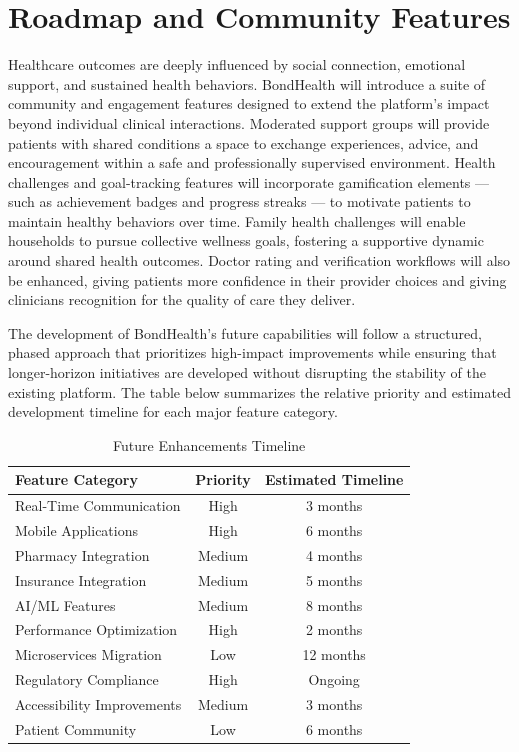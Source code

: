 \section{Roadmap and Community Features}

\noindent Healthcare outcomes are deeply influenced by social connection, emotional support, and sustained health behaviors. BondHealth will introduce a suite of community and engagement features designed to extend the platform's impact beyond individual clinical interactions. Moderated support groups will provide patients with shared conditions a space to exchange experiences, advice, and encouragement within a safe and professionally supervised environment. Health challenges and goal-tracking features will incorporate gamification elements --- such as achievement badges and progress streaks --- to motivate patients to maintain healthy behaviors over time. Family health challenges will enable households to pursue collective wellness goals, fostering a supportive dynamic around shared health outcomes. Doctor rating and verification workflows will also be enhanced, giving patients more confidence in their provider choices and giving clinicians recognition for the quality of care they deliver.

\noindent The development of BondHealth's future capabilities will follow a structured, phased approach that prioritizes high-impact improvements while ensuring that longer-horizon initiatives are developed without disrupting the stability of the existing platform. The table below summarizes the relative priority and estimated development timeline for each major feature category.

\begin{table}[H]
\centering
\begin{tabular}{|l|c|c|}
\hline
\textbf{Feature Category} & \textbf{Priority} & \textbf{Estimated Timeline} \\
\hline
Real-Time Communication & High & 3 months \\
\hline
Mobile Applications & High & 6 months \\
\hline
Pharmacy Integration & Medium & 4 months \\
\hline
Insurance Integration & Medium & 5 months \\
\hline
AI/ML Features & Medium & 8 months \\
\hline
Performance Optimization & High & 2 months \\
\hline
Microservices Migration & Low & 12 months \\
\hline
Regulatory Compliance & High & Ongoing \\
\hline
Accessibility Improvements & Medium & 3 months \\
\hline
Patient Community & Low & 6 months \\
\hline
\end{tabular}
\caption{Future Enhancements Timeline}
\label{tab:timeline}
\end{table}

